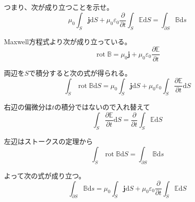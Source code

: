 \documentclass[12pt,b5paper]{ltjsarticle}
\DeclareMathOperator{\Rot}{rot}
\begin{document}
\begin{enumerate}
      つまり、次が成り立つことを示せ。
      \begin{equation}
       \mu_0\int_{S}\bm{j}\mathrm{d}S
        + \mu_0 \varepsilon_0 \frac{\partial}{\partial t}
        \int_{S}\mathbb{E}\mathrm{d}S
        = \int_{\partial S}\mathbb{B}\mathrm{d}s
      \end{equation}



      \dotfill

      Maxwell方程式より次が成り立っている。
      \begin{equation}
       \Rot\mathbb{B}
        = \mu_0\bm{j}
        + \mu_0\varepsilon_0\frac{\partial \mathbb{E}}{\partial t}
      \end{equation}

      両辺を$S$で積分すると次の式が得られる。
      \begin{equation}
      \int_{S} \Rot\mathbb{B} \mathrm{d}S
      = \mu_0 \int_{S} \bm{j} \mathrm{d}S
      + \mu_0\varepsilon_0
      \int_{S} \frac{\partial \mathbb{E}}{\partial t} \mathrm{d}S
      \end{equation}

      右辺の偏微分は$t$の積分ではないので入れ替えて
      \begin{equation}
       \int_{S} \frac{\partial \mathbb{E}}{\partial t} \mathrm{d}S
        = \frac{\partial}{\partial t} \int_{S} \mathbb{E} \mathrm{d}S
      \end{equation}

      左辺はストークスの定理から
      \begin{equation}
       \int_{S} \Rot\mathbb{B} \mathrm{d}S
        = \int_{\partial S} \mathbb{B} \mathrm{d}s
      \end{equation}

      よって次の式が成り立つ。
      \begin{equation}
       \int_{\partial S} \mathbb{B} \mathrm{d}s
        =
        \mu_0 \int_{S} \bm{j} \mathrm{d}S
        + \mu_0\varepsilon_0
        \frac{\partial}{\partial t} \int_{S} \mathbb{E} \mathrm{d}S
      \end{equation}


      \hrulefill


\end{enumerate}
\end{document}
